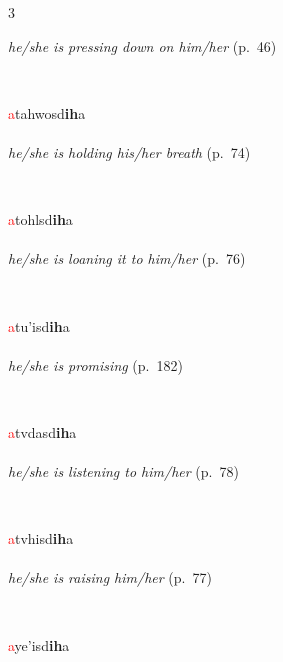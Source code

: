 \documentclass[oneside,openany]{book}%
\begin{document}
\begin{multicols}{3}
\begin{minipage}[t]{\linewidth}
\noindent \textit{he/she is pressing down on him/her} (p.~46)
\end{minipage}\\[1em]%
\begin{minipage}[t]{\linewidth}
\raggedright\noindent \textcolor{Red}{a}tahwosd\textbf{ih}a\\
\\
\noindent \textit{he/she is holding his/her breath} (p.~74)
\end{minipage}\\[1em]%
\begin{minipage}[t]{\linewidth}
\raggedright\noindent \textcolor{Red}{a}tohlsd\textbf{ih}a\\
\\
\noindent \textit{he/she is loaning it to him/her} (p.~76)
\end{minipage}\\[1em]%
\begin{minipage}[t]{\linewidth}
\raggedright\noindent \textcolor{Red}{a}tu'isd\textbf{ih}a\\
\\
\noindent \textit{he/she is promising} (p.~182)
\end{minipage}\\[1em]%
\begin{minipage}[t]{\linewidth}
\raggedright\noindent \textcolor{Red}{a}tvdasd\textbf{ih}a\\
\\
\noindent \textit{he/she is listening to him/her} (p.~78)
\end{minipage}\\[1em]%
\begin{minipage}[t]{\linewidth}
\raggedright\noindent \textcolor{Red}{a}tvhisd\textbf{ih}a\\
\\
\noindent \textit{he/she is raising him/her} (p.~77)
\end{minipage}\\[1em]%
\begin{minipage}[t]{\linewidth}
\raggedright\noindent \textcolor{Red}{a}ye'isd\textbf{ih}a\\

\end{minipage}
\end{multicols}
\end{document}
